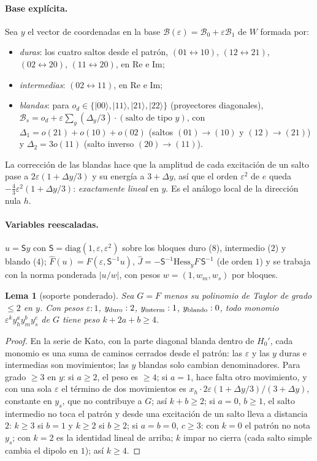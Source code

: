 \documentclass[11pt,a4paper]{article}
\newtheorem{lema}[teorema]{Lema}
\theoremstyle{definition}
\theoremstyle{remark}
\newcommand{\ket}[1]{|#1\rangle}
\newcommand{\eps}{\varepsilon}
\begin{document}
\paragraph{Base explícita.} Sea $y$ el vector de coordenadas en la base
$\mathcal B(\eps)=\mathcal B_0+\eps\mathcal B_1$ de $W$ formada por:
\begin{itemize}
\item \emph{duras}: los cuatro saltos desde el patrón, $(01\leftrightarrow10)$, $(12\leftrightarrow21)$,
  $(02\leftrightarrow20)$, $(11\leftrightarrow20)$, en Re e Im;
\item \emph{intermedias}: $(02\leftrightarrow11)$, en Re e Im;
\item \emph{blandas}: para $o_d\in\{\ket{00},\ket{11},\ket{21},\ket{22}\}$ (proyectores diagonales),
  $\mathcal B_s=o_d+\eps\sum_y(\Delta_y/3)\cdot(\text{salto de tipo }y)$, con
  $\Delta_1=o(21)+o(10)+o(02)$ (saltos $(01)\to(10)$ y $(12)\to(21)$) y $\Delta_2=3o(11)$ (salto inverso
  $(20)\to(11)$).
\end{itemize}
La corrección de las blandas hace que la amplitud de cada excitación de un salto pase a
$2\eps(1+\Delta y/3)$ y su energía a $3+\Delta y$, así que el orden $\eps^2$ de $e$ queda
$-\frac43\eps^2(1+\Delta y/3)$: \emph{exactamente lineal} en $y$. Es el análogo local de la dirección
nula $h$.

\paragraph{Variables reescaladas.} $u=\mathsf Sy$ con $\mathsf S=\mathrm{diag}(1,\eps,\eps^2)$ sobre los bloques duro
($8$), intermedio ($2$) y blando ($4$); $\hat F(u)=F(\eps,\mathsf S^{-1}u)$,
$\hat J=-\mathsf S^{-1}\mathrm{Hess}_y F\,\mathsf S^{-1}$ (de orden $1$) y se trabaja con la norma ponderada $|u/w|$, con
pesos $w=(1,w_m,w_s)$ por bloques.

\begin{lema}[soporte ponderado]\label{lem:soporte}
Sea $G=F$ menos su polinomio de Taylor de grado $\le2$ en $y$. Con pesos $\eps:1$, $y_{\rm duro}:2$,
$y_{\rm interm}:1$, $y_{\rm blando}:0$, todo monomio $\eps^ky_h^ay_m^by_s^c$ de $G$ tiene peso
$k+2a+b\ge4$.
\end{lema}

\begin{proof}
En la serie de Kato, con la parte diagonal blanda dentro de $H_0'$, cada monomio es una suma de caminos
cerrados desde el patrón: las $\eps$ y las $y$ duras e intermedias son movimientos; las $y$ blandas solo
cambian denominadores. Para grado $\ge3$ en $y$:
si $a\ge2$, el peso es $\ge4$;
si $a=1$, hace falta otro movimiento, y con una sola $\eps$ el término de dos movimientos es
$x_h\cdot2\eps(1+\Delta y/3)/(3+\Delta y)$, constante en $y_s$, que no contribuye a $G$; así $k+b\ge2$;
si $a=0$, $b\ge1$, el salto intermedio no toca el patrón y desde una excitación de un salto lleva a
distancia $2$: $k\ge3$ si $b=1$ y $k\ge2$ si $b\ge2$;
si $a=b=0$, $c\ge3$: con $k=0$ el patrón no nota $y_s$; con $k=2$ es la identidad lineal de arriba;
$k$ impar no cierra (cada salto simple cambia el dipolo en $1$); así $k\ge4$.
\end{proof}
\end{document}
